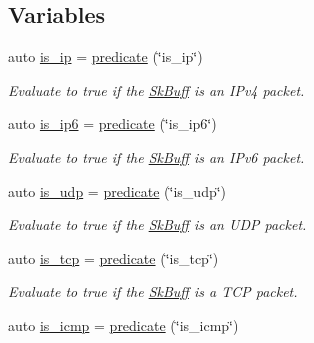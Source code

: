 \subsection*{Variables}
\begin{DoxyCompactItemize}
\item 
auto \hyperlink{namespacepfq_1_1lang_1_1anonymous__namespace_02default_8hpp_03_aa97a34e12e4c6bc2d85a5c169800cfa4}{is\+\_\+ip} = \hyperlink{namespacepfq_1_1lang_aca9adafc436b7f851621b979fa1aaf88}{predicate} (\char`\"{}is\+\_\+ip\char`\"{})
\begin{DoxyCompactList}\small\item\em Evaluate to {\ttfamily true} if the \hyperlink{structpfq_1_1lang_1_1SkBuff}{Sk\+Buff} is an I\+Pv4 packet. \end{DoxyCompactList}\item 
auto \hyperlink{namespacepfq_1_1lang_1_1anonymous__namespace_02default_8hpp_03_a5fa35e94e399b76838b7be894d85b83c}{is\+\_\+ip6} = \hyperlink{namespacepfq_1_1lang_aca9adafc436b7f851621b979fa1aaf88}{predicate} (\char`\"{}is\+\_\+ip6\char`\"{})
\begin{DoxyCompactList}\small\item\em Evaluate to {\ttfamily true} if the \hyperlink{structpfq_1_1lang_1_1SkBuff}{Sk\+Buff} is an I\+Pv6 packet. \end{DoxyCompactList}\item 
auto \hyperlink{namespacepfq_1_1lang_1_1anonymous__namespace_02default_8hpp_03_a42701f36d9dde7f3636b90244d520a16}{is\+\_\+udp} = \hyperlink{namespacepfq_1_1lang_aca9adafc436b7f851621b979fa1aaf88}{predicate} (\char`\"{}is\+\_\+udp\char`\"{})
\begin{DoxyCompactList}\small\item\em Evaluate to {\ttfamily true} if the \hyperlink{structpfq_1_1lang_1_1SkBuff}{Sk\+Buff} is an U\+DP packet. \end{DoxyCompactList}\item 
auto \hyperlink{namespacepfq_1_1lang_1_1anonymous__namespace_02default_8hpp_03_a67fe3072aa5353c1526aa04320d40137}{is\+\_\+tcp} = \hyperlink{namespacepfq_1_1lang_aca9adafc436b7f851621b979fa1aaf88}{predicate} (\char`\"{}is\+\_\+tcp\char`\"{})
\begin{DoxyCompactList}\small\item\em Evaluate to {\ttfamily true} if the \hyperlink{structpfq_1_1lang_1_1SkBuff}{Sk\+Buff} is a T\+CP packet. \end{DoxyCompactList}\item 
auto \hyperlink{namespacepfq_1_1lang_1_1anonymous__namespace_02default_8hpp_03_a01ccba89c8582ba423393226b54f12de}{is\+\_\+icmp} = \hyperlink{namespacepfq_1_1lang_aca9adafc436b7f851621b979fa1aaf88}{predicate} (\char`\"{}is\+\_\+icmp\char`\"{})

\end{DoxyCompactItemize}
